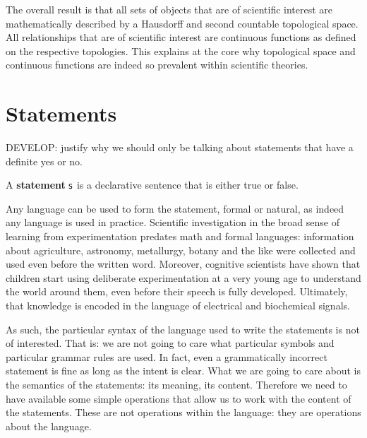\documentclass[11pt,letterpaper,fleqn]{memoir} %
\begin{document}
The overall result is that all sets of objects that are of scientific interest are mathematically described by a Hausdorff and second countable topological space. All relationships that are of scientific interest are continuous functions as defined on the respective topologies. This explains at the core why topological space and continuous functions are indeed so prevalent within scientific theories.

\section{Statements}

DEVELOP: justify why we should only be talking about statements that have a definite yes or no.

\begin{mathSection}

\begin{defn}
	A \textbf{statement} $\mathsf{s}$ is a declarative sentence that is either true or false.
\end{defn}

\end{mathSection}

Any language can be used to form the statement, formal or natural, as indeed any language is used in practice. Scientific investigation in the broad sense of learning from experimentation predates math and formal languages: information about agriculture, astronomy, metallurgy, botany and the like were collected and used even before the written word. Moreover, cognitive scientists have shown that children start using deliberate experimentation at a very young age to understand the world around them, even before their speech is fully developed. Ultimately, that knowledge is encoded in the language of electrical and biochemical signals.

As such, the particular syntax of the language used to write the statements is not of interested. That is: we are not going to care what particular symbols and particular grammar rules are used. In fact, even a grammatically incorrect statement is fine as long as the intent is clear. What we are going to care about is the semantics of the statements: its meaning, its content. Therefore we need to have available some simple operations that allow us to work with the content of the statements. These are not operations within the language: they are operations about the language.

\end{document}
